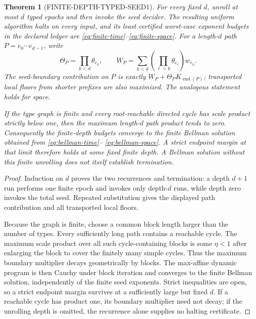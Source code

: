 \documentclass[11pt]{article}
\newtheorem{theorem}{Theorem}[section]
\begin{document}
\begin{theorem}[FINITE-DEPTH-TYPED-SEED1]
For every fixed $d$, unroll at most $d$ typed epochs and then invoke the seed
decider.  The resulting uniform algorithm halts on every input, and its least
certified worst-case exponent budgets in the declared ledger are
\eqref{eq:finite-time}--\eqref{eq:finite-space}.  For a length-$d$ path
$P=e_0\cdots e_{d-1}$, write
\[
 \Theta_P=\prod_{k<d}\theta_{e_k},\qquad
 W_P=\sum_{k<d}\left(\prod_{\ell<k}\theta_{e_\ell}\right)w_{e_k}.
\]
The seed-boundary contribution on $P$ is exactly
$W_P+\Theta_P K_{\operatorname{end}(P)}$; transported local floors from
shorter prefixes are also maximized.  The analogous statement holds for
space.

If the type graph is finite and every root-reachable directed cycle has
scale product strictly below one, then the maximum length-$d$ path product
tends to zero.  Consequently the finite-depth budgets converge to the
finite Bellman solution obtained from \eqref{eq:bellman-time}--
\eqref{eq:bellman-space}.  A strict endpoint margin at that limit therefore
holds at some fixed finite depth.  A Bellman solution without this finite
unrolling does not itself establish termination.
\end{theorem}

\begin{proof}
Induction on $d$ proves the two recurrences and termination: a depth
$d+1$ run performs one finite epoch and invokes only depth-$d$ runs, while
depth zero invokes the total seed.  Repeated substitution gives the displayed
path contribution and all transported local floors.

Because the graph is finite, choose a common block length larger than the
number of types.  Every sufficiently long path contains a reachable cycle.
The maximum scale product over all such cycle-containing blocks is some
$\eta<1$ after enlarging the block to cover the finitely many simple cycles.
Thus the maximum boundary multiplier decays geometrically by blocks.  The
max-affine dynamic program is then Cauchy under block iteration and converges
to the finite Bellman solution, independently of the finite seed exponents.
Strict inequalities are open, so a strict endpoint margin survives at a
sufficiently large but fixed $d$.  If a reachable cycle has product one, its
boundary multiplier need not decay; if the unrolling depth is omitted, the
recurrence alone supplies no halting certificate.
\end{proof}
\end{document}
